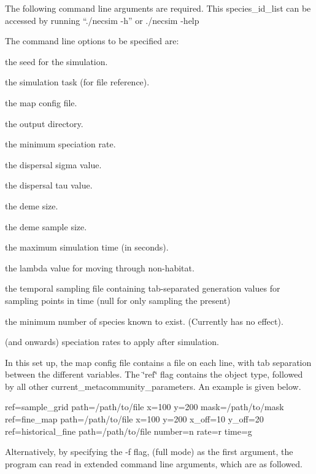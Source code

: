 The following command line arguments are required. This species\+\_\+id\+\_\+list can be accessed by running {\ttfamily “./necsim -\/h”} or {\ttfamily ./necsim -\/help}

The command line options to be specified are\+:


\begin{DoxyEnumerate}
\item the seed for the simulation.
\item the simulation task (for file reference).
\item the map config file.
\item the output directory.
\item the minimum speciation rate.
\item the dispersal sigma value.
\item the dispersal tau value.
\item the deme size.
\item the deme sample size.
\item the maximum simulation time (in seconds).
\item the lambda value for moving through non-\/habitat.
\item the temporal sampling file containing tab-\/separated generation values for sampling points in time (null for only sampling the present)
\item the minimum number of species known to exist. (Currently has no effect).
\item (and onwards) speciation rates to apply after simulation.
\end{DoxyEnumerate}

In this set up, the map config file contains a file on each line, with tab separation between the different variables. The \char`\"{}ref\char`\"{} flag contains the object type, followed by all other current\+\_\+metacommunity\+\_\+parameters. An example is given below.

ref=sample\+\_\+grid path=/path/to/file x=100 y=200 mask=/path/to/mask ref=fine\+\_\+map path=/path/to/file x=100 y=200 x\+\_\+off=10 y\+\_\+off=20 ref=historical\+\_\+fine path=/path/to/file number=n rate=r time=g

Alternatively, by specifying the -\/f flag, (full mode) as the first argument, the program can read in extended command line arguments, which are as followed.


